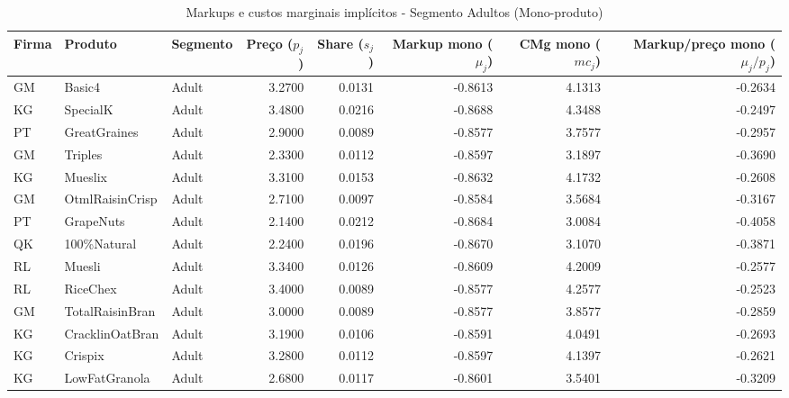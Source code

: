 


\begingroup
\begin{table}[H]
\centering
\caption{Markups e custos marginais implícitos - Segmento Adultos (Mono-produto)}
\label{tab:markups-adult-mono}
\scriptsize
\setlength{\tabcolsep}{3pt}
\renewcommand{\arraystretch}{1.05}
\begin{tabular}{@{}llp{}rrrrr@{}}
\toprule
Firma & Produto & Segmento & Preço ($p_j$) & Share ($s_j$) & Markup mono ($\mu_j$) & CMg mono ($mc_j$) & Markup/preço mono ($\mu_j/p_j$) \\
\midrule
GM & Basic4 & Adult & 3.2700 & 0.0131 & -0.8613 & 4.1313 & -0.2634 \\
KG & SpecialK & Adult & 3.4800 & 0.0216 & -0.8688 & 4.3488 & -0.2497 \\
PT & GreatGraines & Adult & 2.9000 & 0.0089 & -0.8577 & 3.7577 & -0.2957 \\
GM & Triples & Adult & 2.3300 & 0.0112 & -0.8597 & 3.1897 & -0.3690 \\
KG & Mueslix & Adult & 3.3100 & 0.0153 & -0.8632 & 4.1732 & -0.2608 \\
GM & OtmlRaisinCrisp & Adult & 2.7100 & 0.0097 & -0.8584 & 3.5684 & -0.3167 \\
PT & GrapeNuts & Adult & 2.1400 & 0.0212 & -0.8684 & 3.0084 & -0.4058 \\
QK & 100\%Natural & Adult & 2.2400 & 0.0196 & -0.8670 & 3.1070 & -0.3871 \\
RL & Muesli & Adult & 3.3400 & 0.0126 & -0.8609 & 4.2009 & -0.2577 \\
RL & RiceChex & Adult & 3.4000 & 0.0089 & -0.8577 & 4.2577 & -0.2523 \\
GM & TotalRaisinBran & Adult & 3.0000 & 0.0089 & -0.8577 & 3.8577 & -0.2859 \\
KG & CracklinOatBran & Adult & 3.1900 & 0.0106 & -0.8591 & 4.0491 & -0.2693 \\
KG & Crispix & Adult & 3.2800 & 0.0112 & -0.8597 & 4.1397 & -0.2621 \\
KG & LowFatGranola & Adult & 2.6800 & 0.0117 & -0.8601 & 3.5401 & -0.3209 \\

\end{tabular}
\end{table}
